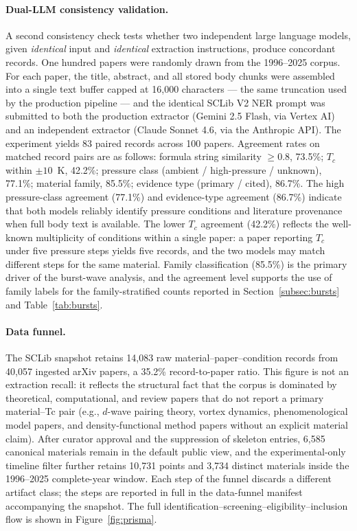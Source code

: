 \documentclass[11pt]{article}
\begin{document}
\paragraph{Dual-LLM consistency validation.} A second consistency check tests whether two independent large language models, given \emph{identical} input and \emph{identical} extraction instructions, produce concordant records. One hundred papers were randomly drawn from the 1996--2025 corpus. For each paper, the title, abstract, and all stored body chunks were assembled into a single text buffer capped at 16{,}000 characters --- the same truncation used by the production pipeline --- and the identical SCLib V2 NER prompt was submitted to both the production extractor (Gemini 2.5 Flash, via Vertex AI) and an independent extractor (Claude Sonnet 4.6, via the Anthropic API). The experiment yields 83 paired records across 100 papers. Agreement rates on matched record pairs are as follows: formula string similarity $\geq 0.8$, 73.5\%; $T_c$ within $\pm 10$~K, 42.2\%; pressure class (ambient / high-pressure / unknown), 77.1\%; material family, 85.5\%; evidence type (primary / cited), 86.7\%. The high pressure-class agreement (77.1\%) and evidence-type agreement (86.7\%) indicate that both models reliably identify pressure conditions and literature provenance when full body text is available. The lower $T_c$ agreement (42.2\%) reflects the well-known multiplicity of conditions within a single paper: a paper reporting $T_c$ under five pressure steps yields five records, and the two models may match different steps for the same material. Family classification (85.5\%) is the primary driver of the burst-wave analysis, and the agreement level supports the use of family labels for the family-stratified counts reported in Section~\ref{subsec:bursts} and Table~\ref{tab:bursts}.

\paragraph{Data funnel.} The SCLib snapshot retains 14{,}083 raw material--paper--condition records from 40{,}057 ingested arXiv papers, a 35.2\% record-to-paper ratio. This figure is not an extraction recall: it reflects the structural fact that the corpus is dominated by theoretical, computational, and review papers that do not report a primary material--Tc pair (e.g., $d$-wave pairing theory, vortex dynamics, phenomenological model papers, and density-functional method papers without an explicit material claim). After curator approval and the suppression of skeleton entries, 6{,}585 canonical materials remain in the default public view, and the experimental-only timeline filter further retains 10{,}731 points and 3{,}734 distinct materials inside the 1996--2025 complete-year window. Each step of the funnel discards a different artifact class; the steps are reported in full in the data-funnel manifest accompanying the snapshot. The full identification--screening--eligibility--inclusion flow is shown in Figure~\ref{fig:prisma}.
\end{document}

